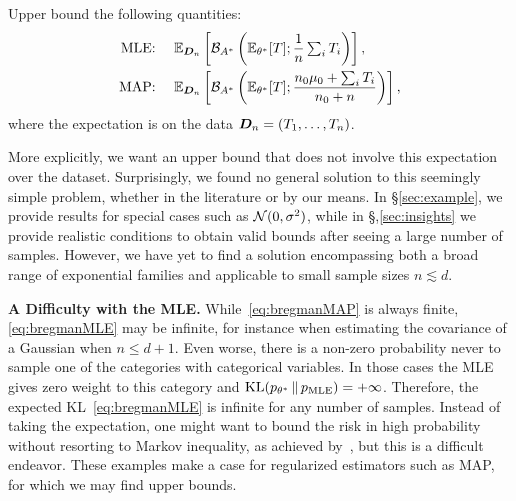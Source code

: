 \begin{problem}
Upper bound the following quantities:
\begin{align}
	\label{eq:bregmanMLE}
	\text{MLE: } \quad &\expect[\mD_n]{\bregmanconj \left (\E_{\nat^*} [T] ;  \inv{n}  \smallsum_i T_i \right )}, \\
	\label{eq:bregmanMAP}
	\text{MAP: } \quad &\expect[\mD_n]{\bregmanconj \left (\E_{\nat^*} [T] ; \frac{n_0 \m_0 + \smallsum_i T_i}{n_0+n} \right )},
\end{align}
where the expectation is on the data ${\bm{D}}_n = (T_1, \dots, T_n)$.
\end{problem}

More explicitly, we want an upper bound that does not involve this expectation over the dataset.
Surprisingly, we found no general solution to this seemingly simple problem, whether in the literature or by our means.
In \S\ref{sec:example}, we provide results for special cases such as ${\mathcal N}(0, \sigma^2)$,
while in \S,\ref{sec:insights} we provide realistic conditions to obtain valid bounds after seeing a large number of samples.
However, we have yet to find a solution encompassing both a broad range of exponential families
and applicable to small sample sizes $n \lesssim d$.

{\bf A Difficulty with the MLE.}
While~\eqref{eq:bregmanMAP} is always finite, \eqref{eq:bregmanMLE} may be infinite,
for instance when estimating the covariance of a Gaussian when $n \leq d + 1$.
Even worse, there is a non-zero probability never to sample one of the categories with categorical variables.
In those cases the MLE gives zero weight to this category and $\mathrm{KL}(p_{\theta^*} \,\Vert\, p_\text{MLE} ) = +\infty$.
Therefore, the expected KL~\eqref{eq:bregmanMLE} is infinite for any number of samples.
Instead of taking the expectation, one might want to bound the risk in high probability
without resorting to Markov inequality, as achieved by~\citep{ostrovskii2021finite},
 but this is a difficult endeavor.
These examples make a case for regularized estimators such as MAP,
for which we may find upper bounds.

